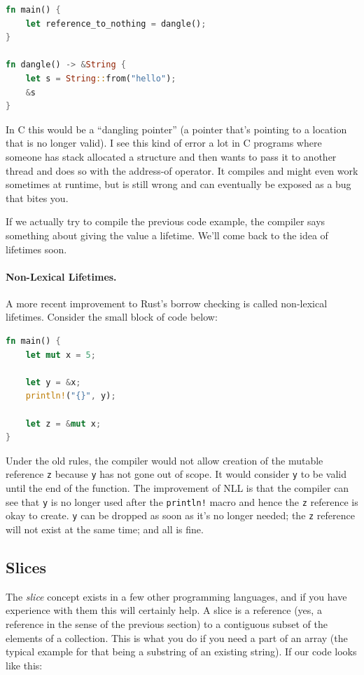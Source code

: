 \documentclass[a4paper]{report}
\begin{document}
\begin{lstlisting}[language=Rust]
fn main() {
    let reference_to_nothing = dangle();
}

fn dangle() -> &String {
    let s = String::from("hello");
    &s
}
\end{lstlisting} 

In C this would be a ``dangling pointer'' (a pointer that's pointing to a location that is no longer valid). I see this kind of error a lot in C programs where someone has stack allocated a structure and then wants to pass it to another thread and does so with the address-of operator. It compiles and might even work sometimes at runtime, but is still wrong and can eventually be exposed as a bug that bites you.

If we actually try to compile the previous code example, the compiler says something about giving the value a lifetime. We'll come back to the idea of lifetimes soon.

\paragraph{Non-Lexical Lifetimes.} A more recent improvement to Rust's borrow checking is called non-lexical lifetimes. Consider the small block of code below:
\begin{lstlisting}[language=Rust]
fn main() {
    let mut x = 5;

    let y = &x;
    println!("{}", y);

    let z = &mut x;
}
\end{lstlisting}

Under the old rules, the compiler would not allow creation of the mutable reference \texttt{z} because \texttt{y} has not gone out of scope. It would consider \texttt{y} to be valid until the end of the function. The improvement of NLL is that the compiler can see that \texttt{y} is no longer used after the \texttt{println!} macro and hence the \texttt{z} reference is okay to create. \texttt{y} can be dropped as soon as it's no longer needed; the \texttt{z} reference will not exist at the same time; and all is fine.

\subsection*{Slices}
The \textit{slice} concept exists in a few other programming languages, and if you have experience with them this will certainly help. A slice is a reference (yes, a reference in the sense of the previous section) to a contiguous subset of the elements of a collection. This is what you do if you need a part of an array (the typical example for that being a substring of an existing string). If our code looks like this:
\end{document}
